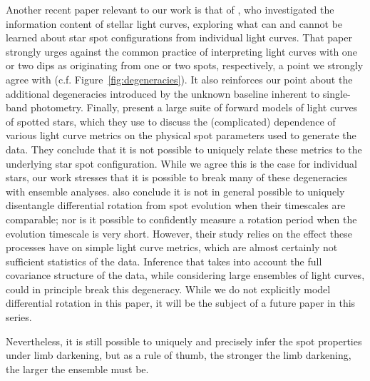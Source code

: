 \documentclass[modern]{aastex62}
\begin{document}
Another recent paper relevant to our work is that of \citet{Basri2020}, who
investigated the information content of stellar light curves, exploring what
can and cannot be learned about star spot configurations from individual
light curves. That paper strongly urges against the common practice
of interpreting
light curves with one or two dips as originating from one or two spots,
respectively, a point we strongly agree with (c.f. Figure~\ref{fig:degeneracies}).
It also reinforces our point about the additional degeneracies introduced
by the unknown baseline inherent to single-band photometry.
%
Finally, \citet{Basri2020} present a large suite of forward models of light curves of
spotted stars, which they use to discuss the (complicated) dependence of
various light curve metrics on
the physical spot parameters used to generate the data. They conclude that it
is not possible to uniquely relate these metrics to the underlying star spot
configuration. While we agree this is the case for individual stars, our work
stresses that it is possible to break many of these degeneracies with
ensemble analyses.
%
\citet{Basri2020} also conclude it is not in general possible to
uniquely disentangle differential rotation from spot evolution when their
timescales are comparable; nor is it possible to confidently measure a rotation
period when the evolution timescale is very short. However, their study
relies on the effect these processes have on simple light curve metrics,
which are almost certainly not sufficient statistics of the data. Inference
that takes into account the full covariance structure of the data, while
considering large ensembles of light curves, could in principle break
this degeneracy. While we do not explicitly model differential rotation in
this paper, it will be the subject of a future paper in this series.


Nevertheless, it is still possible to uniquely and precisely infer the spot properties
under limb darkening,
but as a rule of thumb, the stronger the limb darkening, the larger the
ensemble must be.


\end{document}
